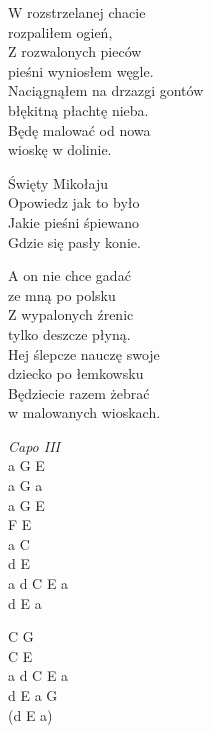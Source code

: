 \begin{text}
    \chordfill
    W rozstrzelanej chacie\\
    rozpaliłem ogień,\\
    Z rozwalonych pieców\\
    pieśni wyniosłem węgle.\\
    Naciągnąłem na drzazgi gontów\\
    błękitną płachtę nieba.\\
    Będę malować od nowa\\
    wioskę w dolinie.

    \vin Święty Mikołaju\\
    \vin Opowiedz jak to było\\
    \vin Jakie pieśni śpiewano\\
    \vin Gdzie się pasły konie.

    A on nie chce gadać\\
    ze mną po polsku\\
    Z wypalonych źrenic\\
    tylko deszcze płyną.\\
    Hej ślepcze nauczę swoje\\
    dziecko po łemkowsku\\
    Będziecie razem żebrać\\
    w malowanych wioskach.
\end{text}
\begin{chord}
    \textit{Capo III}\\
    a G E\\
    a G a\\
    a G E\\
    F E\\
    a C\\
    d E\\
    a d C E a\\
    d E a

    C G\\
    C E\\
    a d C E a\\
    d E a G\\
    (d E a)
\end{chord}